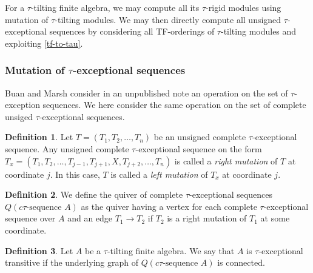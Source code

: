 \documentclass[]{article}
\theoremstyle{definition}
\newtheorem{definition}{Definition}[section]
\newcommand{\tu}{\ensuremath{\tau}}
\begin{document}
For a $\tau$-tilting finite algebra, we may compute all its \tu-rigid modules using mutation of \tu-tilting modules. We may then directly compute all unsigned \tu-exceptional sequences by considering all TF-orderings of \tu-tilting modules and exploiting \cref{tf-to-tau}.

\subsubsection{Mutation of \tu-exceptional sequences}
Buan and Marsh consider in an unpublished note an operation on the set of \tu-exception sequences. We here consider the same operation on the set of complete unsiged \tu-exceptional sequences.

\begin{definition}
	Let $ T = (T_1,T_2,\dots,T_n)$ be an unsigned complete \tu-exceptional sequence. Any unsigned complete \tu-exceptional sequence on the form $T_x = (T_1,T_2,\dots,T_{j-1},T_{j+1},X,T_{j+2},\dots,T_n)$ is called a \textit{right mutation} of $T$ at coordinate $j$. In this case, $T$ is called a  \textit{left mutation} of $T_x$ at coordinate $j$.
\end{definition}

\begin{definition}
	We define the quiver of complete \tu-exceptional sequences $Q(c\tu \text{-sequence } A)$ as the quiver having a vertex for each complete \tu-exceptional sequence over $A$ and an edge $T_1 \to T_2$ if $T_2$ is a right mutation of $T_1$ at some coordinate.
\end{definition}

\begin{definition}
	Let $A$ be a \tu-tilting finite algebra. We say that $A$ is \tu-exceptional transitive if the underlying graph of $Q(c\tu \text{-sequence } A)$ is connected.
\end{definition}
\end{document}
